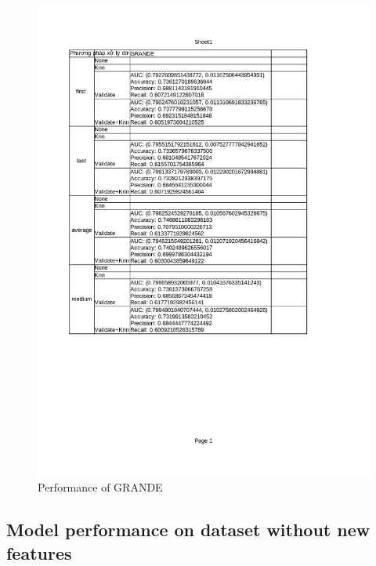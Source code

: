 \documentclass[../main.tex]{subfiles}
\begin{document}
 \begin{figure}[H]
    \centering
    \includegraphics[width=\textwidth]{Figure/KidneyResultLimit_GRANDE.png}
    \caption{Performance of GRANDE}
    \label{fig:KidneyResultLimit_GRANDE}
\end{figure}


\subsection{Model performance on dataset without new features}
\end{document}
